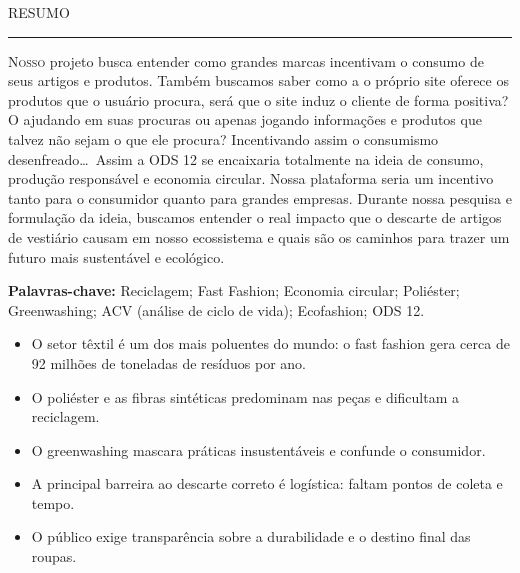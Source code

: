 \documentclass[12pt, a4paper]{article}
\begin{document}
\pagestyle{corpo}

\begin{center}
  {\sffamily\large\color{oliveDeep} \MakeUppercase{Resumo}}\\[3pt]
  {\color{oliveSoft}\rule{1.8cm}{1pt}}
\end{center}
\vspace{0.5cm}

{\color{ink}
\lettrine[lines=3, lhang=0.08, findent=3pt, nindent=8pt]{\color{oliveDeep}\sffamily N}{osso} projeto busca entender como grandes marcas incentivam o consumo de seus artigos e produtos. Também buscamos saber como a o próprio site oferece os produtos que o usuário procura, será que o site induz o cliente de forma positiva? O ajudando em suas procuras ou apenas jogando informações e produtos que talvez não sejam o que ele procura? Incentivando assim o consumismo desenfreado\ldots\ Assim a ODS 12 se encaixaria totalmente na ideia de consumo, produção responsável e economia circular. Nossa plataforma seria um incentivo tanto para o consumidor quanto para grandes empresas. Durante nossa pesquisa e formulação da ideia, buscamos entender o real impacto que o descarte de artigos de vestiário causam em nosso ecossistema e quais são os caminhos para trazer um futuro mais sustentável e ecológico.
\par}

\vspace{6pt}
\noindent\textbf{Palavras-chave:} Reciclagem; Fast Fashion; Economia circular; Poliéster; Greenwashing; ACV (análise de ciclo de vida); Ecofashion; ODS 12.

\vspace{10pt}
\vspace{2pt}

\begin{itemize}[leftmargin=1.2em, itemsep=4pt, label=\textcolor{oliveSoft}{\textbf{\textbullet}}]
  \item O setor têxtil é um dos mais poluentes do mundo: o fast fashion gera cerca de 92 milhões de toneladas de resíduos por ano.
  \item O poliéster e as fibras sintéticas predominam nas peças e dificultam a reciclagem.
  \item O greenwashing mascara práticas insustentáveis e confunde o consumidor.
  \item A principal barreira ao descarte correto é logística: faltam pontos de coleta e tempo.
  \item O público exige transparência sobre a durabilidade e o destino final das roupas.
\end{itemize}
\end{document}

